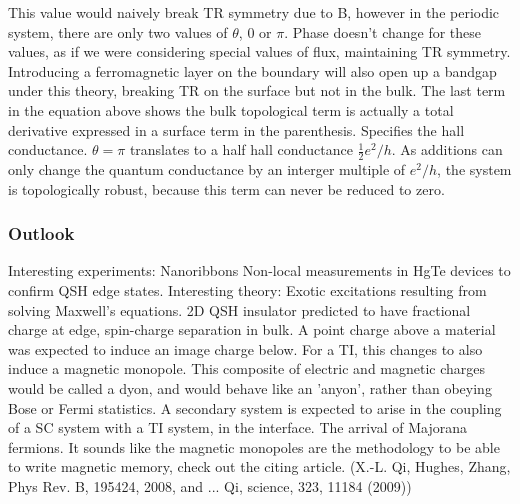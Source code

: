 \documentclass[../mattg_ti-fi_lit-review.tex]{subfiles}
\begin{document}
\begin{outline}
		\3 This value would naively break TR symmetry due to B, however in the periodic system, there are only two values of $\theta$, 0 or $\pi$. Phase doesn't change for these values, as if we were considering special values of flux, maintaining TR symmetry. 
		\3 Introducing a ferromagnetic layer on the boundary will also open up a bandgap under this theory, breaking TR on the surface but not in the bulk.
		\3 The last term in the equation above shows the bulk topological term is actually a total derivative expressed in a surface term in the parenthesis.
		\4 Specifies the hall conductance. $\theta=\pi$ translates to a half hall conductance $\frac{1}{2}e^2/h$. 
		\4 As additions can only change the quantum conductance by an interger multiple of $e^2/h$, the system is topologically robust, because this term can never be reduced to zero.		
	\end{outline}
	
	\subsubsection{Outlook}
	\begin{outline}
		\1 Interesting experiments:
		\2 Nanoribbons
		\2 Non-local measurements in HgTe devices to confirm QSH edge states.
		\1 Interesting theory:
		\2 Exotic excitations resulting from solving Maxwell's equations.
		\2 2D QSH insulator predicted to have fractional charge at edge, spin-charge separation in bulk.
		\2 A point charge above a material was expected to induce an image charge below. For a TI, this changes to also induce a magnetic monopole. This composite of electric and magnetic charges would be called a dyon, and would behave like an 'anyon', rather than obeying Bose or Fermi statistics.
		\2 A secondary system is expected to arise in the coupling of a SC system with a TI system, in the interface. The arrival of Majorana fermions.
		\2 It sounds like the magnetic monopoles are the methodology to be able to write magnetic memory, check out the citing article. (X.-L. Qi, Hughes, Zhang, Phys Rev. B, 195424, 2008, and ... Qi, science, 323, 11184 (2009))
		
	\end{outline}
	
\end{document}
